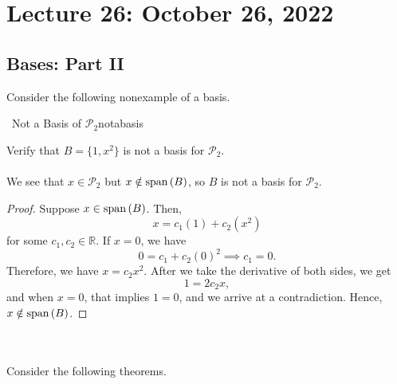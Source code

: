 \pagebreak

\section{Lecture 26: October 26, 2022}

    \subsection{Bases: Part II}

        Consider the following nonexample of a basis.
        \begin{example}{\Difficulty\,\Difficulty\,\,Not a Basis of \(\mathcal{P}_2\)}{notabasis}

            Verify that \(B=\{1,x^2\}\) is not a basis for \(\mathcal{P}_2\).
            \\
            \\
           We see that \(x\in\mathcal{P}_2\) but \(x\notin\text{span\,}(B)\), so \(B\) is not a basis for \(\mathcal{P}_2\).
            \begin{proof}
                Suppose \(x\in\text{span\,}(B)\). Then,
                \begin{equation*}
                    x=c_1(1)+c_2(x^2)
                \end{equation*}
                for some \(c_1,c_2\in\mathbb{R}\). If \(x=0\), we have
                \begin{equation*}
                    0=c_1+c_2(0)^2\implies c_1=0.
                \end{equation*} 
                Therefore, we have \(x=c_2x^2\). After we take the derivative of both sides, we get
                \begin{equation*}
                    1=2c_2x,
                \end{equation*}
                and when \(x=0\), that implies \(1=0\), and we arrive at a contradiction. Hence, \(x\notin\text{span\,}(B)\).
            \end{proof}
            
        \end{example}
        \pagebreak
        \vphantom
        \\
        \\
        Consider the following theorems.
